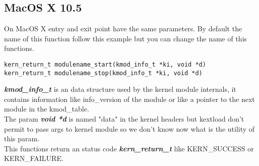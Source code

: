\documentclass[11pt]{report}
\begin{document}
  \subsection{MacOS X 10.5}
  On MacOS X entry and exit point have the same parameters. By default the name of this function follow this example but you can change the name of this functions.
    \begin{lstlisting}
kern_return_t modulename_start(kmod_info_t *ki, void *d)
kern_return_t modulename_stop(kmod_info_t *ki, void *d)
    \end{lstlisting}
{\bf \it kmod\_info\_t} is an data structure used by the kernel module internals, it contains information like info\_version of the module or like a pointer to the next module in the kmod\_table.\\
The param {\bf \it void *d} is named "data" in the kernel headers but kextload don't permit to pass args to kernel module so we don't know now what is the utility of this param.\\ %
This functions return an status code {\bf \it kern\_return\_t} like KERN\_SUCCESS or KERN\_FAILURE.
	
\end{document}
